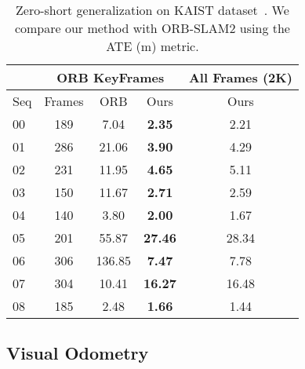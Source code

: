 \documentclass[twocolumn]{svjour3}
\renewcommand{\cite}[1]{\textcolor{blue}{\citep{#1}}}
\begin{document}
\begin{table}[t]
  \setlength{\tabcolsep}{1mm}
  \caption{Zero-short generalization on KAIST dataset~\cite{jeong2019complex}. We compare our method with ORB-SLAM2 using the ATE (m) metric. 
  }\label{tab:kaist}
  \centering
  \begin{tabular}{| l | c | c | c | c |}
    \cline{2-5}
    \multicolumn{1}{c|}{} & \multicolumn{3}{c|}{ORB KeyFrames} & \multicolumn{1}{c|}{All Frames (2K)} \\
    \hline
    Seq & Frames & ORB & Ours  & Ours \\
    \hline
    00 & 189 & 7.04 & \textbf{2.35} & 2.21 \\
    \hline
    01 & 286 & 21.06 & \textbf{3.90} & 4.29 \\
    \hline
    02 & 231 & 11.95 & \textbf{4.65} & 5.11 \\
    \hline
    03 & 150 & 11.67 & \textbf{2.71} & 2.59 \\
    \hline
    04 & 140 & 3.80 & \textbf{2.00}  & 1.67 \\
    \hline
    05 & 201 & 55.87 & \textbf{27.46} & 28.34 \\
    \hline
    06 & 306 & 136.85 & \textbf{7.47} & 7.78 \\
    \hline    
    07 & 304 & 10.41 & \textbf{16.27} & 16.48 \\
    \hline    
    08 & 185 & 2.48 & \textbf{1.66} & 1.44 \\
    \hline
  \end{tabular}
\end{table}



\subsection{Visual Odometry}
\end{document}
